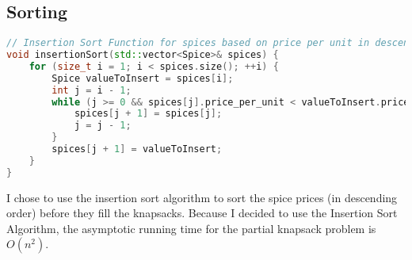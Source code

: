\documentclass[letterpaper, 10pt,DIV=13]{scrartcl}
\numberwithin{equation}{section} %
\numberwithin{figure}{section} %
\numberwithin{table}{section} %
\begin{document}
\subsection{Sorting}
\begin{lstlisting}[language=c++, caption= Insertion Sort Algorithm]
// Insertion Sort Function for spices based on price per unit in descending order
void insertionSort(std::vector<Spice>& spices) {
    for (size_t i = 1; i < spices.size(); ++i) {
        Spice valueToInsert = spices[i];
        int j = i - 1;
        while (j >= 0 && spices[j].price_per_unit < valueToInsert.price_per_unit) {
            spices[j + 1] = spices[j];
            j = j - 1;
        }
        spices[j + 1] = valueToInsert;
    }
}
\end{lstlisting}
I chose to use the insertion sort algorithm to sort the spice prices (in descending order) before they fill the knapsacks. Because I decided to use the Insertion Sort Algorithm, the asymptotic running time for the partial knapsack problem is $O(n^2)$.
\pagebreak
\end{document}
